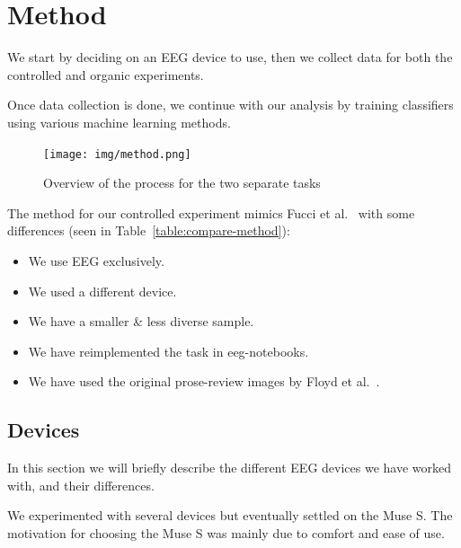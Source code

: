 \chapter{Method}

We start by deciding on an EEG device to use, then we collect data for both the controlled and organic experiments.

Once data collection is done, we continue with our analysis by training classifiers using various machine learning methods.

\begin{figure}[h]
    \begin{center}
        \texttt{[image: img/method.png]}
    \end{center}
    \caption{Overview of the process for the two separate tasks}\label{fig:method}
\end{figure}

The method for our controlled experiment mimics Fucci et al.~\cite{fucci_replication_2019} with some differences (seen in Table~\ref{table:compare-method}): 

\begin{itemize}
        \item We use EEG exclusively.
        \item We used a different device.
        \item We have a smaller \& less diverse sample.
        \item We have reimplemented the task in eeg-notebooks.
        \item We have used the original prose-review images by Floyd et al.~\cite{floyd_decoding_2017}.
\end{itemize}

\begin{landscape}
    
\end{landscape}

\section{Devices}
    
    In this section we will briefly describe the different EEG devices we have worked with, and their differences.

    We experimented with several devices but eventually settled on the Muse S. The motivation for choosing the Muse S was mainly due to comfort and ease of use. 

